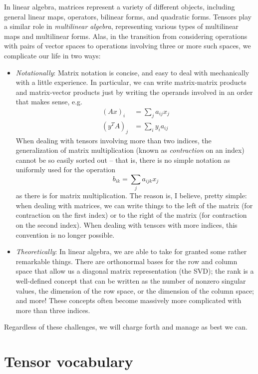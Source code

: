 \documentclass[12pt, leqno]{article} %
\begin{document}
In linear algebra, matrices represent a variety of different objects,
including general linear maps, operators, bilinear forms, and
quadratic forms.  Tensors play a similar role in
{\em multilinear algebra}, representing various types of multilinear
maps and multilinear forms.  Alas, in the transition from considering
operations with pairs of vector spaces to operations involving three
or more such spaces, we complicate our life in two ways:
\begin{itemize}
\item {\em Notationally}: Matrix notation is concise, and easy to deal
  with mechanically with a little experience.  In particular, we can
  write matrix-matrix products and matrix-vector products just by
  writing the operands involved in an order that makes sense, e.g.
  \begin{align*}
    (Ax)_i &= \sum_{j} a_{ij} x_j \\
    (y^T A)_j &= \sum_{i} y_i a_{ij}
  \end{align*}
  When dealing with tensors involving more than two indices, the
  generalization of matrix multiplication (known as {\em contraction}
  on an index) cannot be so easily sorted out -- that is, there is no
  simple notation as uniformly used for the operation
  \[
    b_{ik} = \sum_j a_{ijk} x_j
  \]
  as there is for matrix multiplication.  The reason is, I believe,
  pretty simple: when dealing with matrices, we can write things to
  the left of the matrix (for contraction on the first index) or to the
  right of the matrix (for contraction on the second index).  When
  dealing with tensors with more indices, this convention is no longer
  possible.
\item {\em Theoretically}: In linear algebra, we are able to take for
  granted some rather remarkable things.  There are orthonormal bases
  for the row and column space that allow us a diagonal matrix
  representation (the SVD); the rank is a well-defined concept that
  can be written as the number of nonzero singular values, the
  dimension of the row space, or the dimension of the column space;
  and more!  These concepts often become massively more complicated
  with more than three indices.
\end{itemize}
Regardless of these challenges, we will charge forth and manage as
best we can.

\section{Tensor vocabulary}
\end{document}

